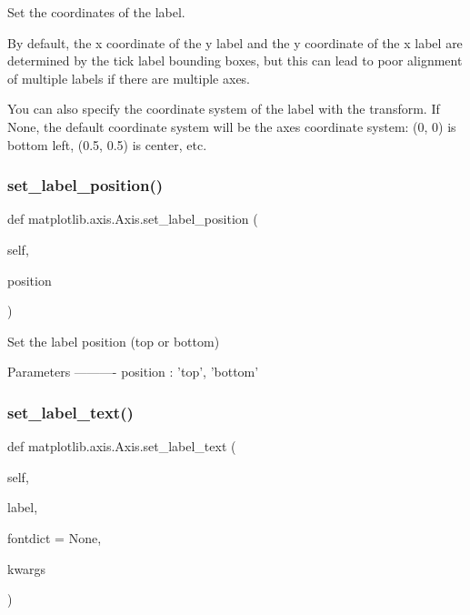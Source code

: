 \begin{DoxyVerb}Set the coordinates of the label.

By default, the x coordinate of the y label and the y coordinate of the
x label are determined by the tick label bounding boxes, but this can
lead to poor alignment of multiple labels if there are multiple axes.

You can also specify the coordinate system of the label with the
transform.  If None, the default coordinate system will be the axes
coordinate system: (0, 0) is bottom left, (0.5, 0.5) is center, etc.
\end{DoxyVerb}
 \mbox{\label{classmatplotlib_1_1axis_1_1Axis_ab689afaf99f2fe9c83ec184b6c8198e4}} 
\subsubsection{\texorpdfstring{set\+\_\+label\+\_\+position()}{set\_label\_position()}}
{\footnotesize\ttfamily def matplotlib.\+axis.\+Axis.\+set\+\_\+label\+\_\+position (\begin{DoxyParamCaption}\item[{}]{self,  }\item[{}]{position }\end{DoxyParamCaption})}

\begin{DoxyVerb}Set the label position (top or bottom)

Parameters
----------
position : {'top', 'bottom'}
\end{DoxyVerb}
 \mbox{\label{classmatplotlib_1_1axis_1_1Axis_aa3d94188ab475820feee45ffb380b435}} 
\subsubsection{\texorpdfstring{set\+\_\+label\+\_\+text()}{set\_label\_text()}}
{\footnotesize\ttfamily def matplotlib.\+axis.\+Axis.\+set\+\_\+label\+\_\+text (\begin{DoxyParamCaption}\item[{}]{self,  }\item[{}]{label,  }\item[{}]{fontdict = {\ttfamily None},  }\item[{}]{kwargs }\end{DoxyParamCaption})}

